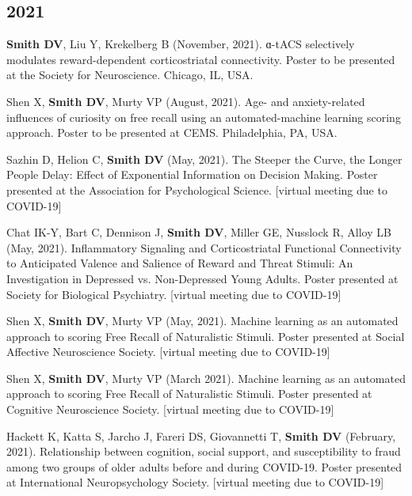 \documentclass[11pt, letterpaper]{article}
\begin{document}
\subsection*{2021}
\begin{hangparas}{.5in}{1}

\textbf{Smith DV}, Liu Y, Krekelberg B (November, 2021). ɑ-tACS selectively modulates reward-dependent corticostriatal connectivity. Poster to be presented at the Society for Neuroscience. Chicago, IL, USA. 

Shen X, \textbf{Smith DV}, Murty VP (August, 2021). Age- and anxiety-related influences of curiosity on free recall using an automated-machine learning scoring approach. Poster to be presented at CEMS. Philadelphia, PA, USA.

Sazhin D, Helion C, \textbf{Smith DV} (May, 2021). The Steeper the Curve, the Longer People Delay: Effect of Exponential Information on Decision Making. Poster presented at the Association for Psychological Science. [virtual meeting due to COVID-19]

Chat IK-Y, Bart C, Dennison J, \textbf{Smith DV}, Miller GE, Nusslock R, Alloy LB (May, 2021). Inflammatory Signaling and Corticostriatal Functional Connectivity to Anticipated Valence and Salience of Reward and Threat Stimuli: An Investigation in Depressed vs. Non-Depressed Young Adults. Poster presented at Society for Biological Psychiatry. [virtual meeting due to COVID-19]

Shen X, \textbf{Smith DV}, Murty VP (May, 2021). Machine learning as an automated approach to scoring Free Recall of Naturalistic Stimuli. Poster presented at Social Affective Neuroscience Society. [virtual meeting due to COVID-19]

Shen X, \textbf{Smith DV}, Murty VP (March 2021). Machine learning as an automated approach to scoring Free Recall of Naturalistic Stimuli. Poster presented at Cognitive Neuroscience Society. [virtual meeting due to COVID-19]

Hackett K, Katta S, Jarcho J, Fareri DS, Giovannetti T, \textbf{Smith DV} (February, 2021). Relationship between cognition, social support, and susceptibility to fraud among two groups of older adults before and during COVID-19. Poster presented at International Neuropsychology Society. [virtual meeting due to COVID-19]

\end{hangparas}
\end{document}
